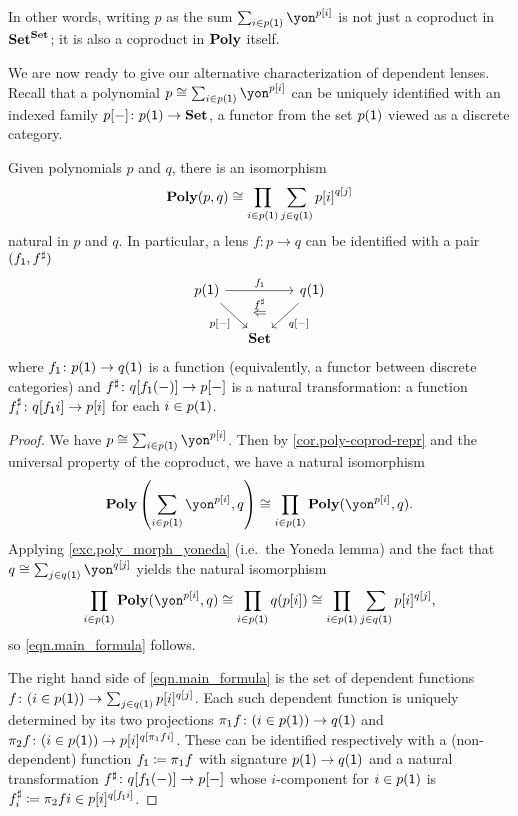 \documentclass[Book-Poly]{subfiles}
\begin{document}
In other words, writing $p$ as the sum $\sum_{i\in p(\1)}\yon^{p[i]}$ is not just a coproduct in $\mathbf{Set}^{\mathbf{Set}}$; it is also a coproduct in $\mathbf{Poly}$ itself.

We are now ready to give our alternative characterization of dependent lenses.
Recall that a polynomial $p\iso\sum_{i\in p(\1)}\yon^{p[i]}$ can be uniquely identified with an indexed family $p[-]\colon p(\textsf{1})\to\mathbf{Set}$, a functor from the set $p(\textsf{1})$ viewed as a discrete category.

\begin{proposition}\label{prop.lens-prod-sum}
Given polynomials $p$ and $q$, there is an isomorphism
\begin{equation}\label{eqn.main_formula}
\mathbf{Poly}(p,q)\cong\prod_{i\in p(\textsf{1})}\sum_{j\in q(\textsf{1})}{p[i]}^{q[j]}
\end{equation}
natural in $p$ and $q$.
In particular, a lens $f\colon p\to q$ can be identified with a pair $(f_{\textsf{1}},f^\sharp)$
\begin{equation}\label{eqn.colax_poly_map}
\begin{tikzcd}[column sep=small]
	p(\1)\ar[dr, "p{[-]}"']\ar[rr, "f_\1"]&~&
	q(\1)\ar[dl, "q{[-]}"]\\&
	\smset\ar[u, phantom, near end, "\overset{f^\sharp}{\Leftarrow}"]
\end{tikzcd}
\end{equation}
where $f_{\textsf{1}}\colon p(\textsf{1})\to q(\textsf{1})$ is a function (equivalently, a functor between discrete categories) and $f^\sharp \colon q[f_{\textsf{1}}(-)] \to p[-]$ is a natural transformation: a function $f^\sharp_i\colon q[f_{\textsf{1}}i]\to p[i]$ for each $i\in p(\textsf{1})$.
\end{proposition}
\begin{proof}
We have $p\iso\sum_{i\in p(\1)}\yon^{p[i]}$.
Then by \cref{cor.poly-coprod-repr} and the universal property of the coproduct, we have a natural isomorphism
\[
    \poly\left(\sum_{i\in p(\1)}\yon^{p[i]}, q\right) \iso \prod_{i\in p(\1)}\poly(\yon^{p[i]},q).
\]
Applying \cref{exc.poly_morph_yoneda} (i.e.\ the Yoneda lemma) and the fact that $q\iso\sum_{j\in q(\1)}\yon^{q[j]}$ yields the natural isomorphism
\[
  \prod_{i\in p(\1)}\poly(\yon^{p[i]},q) \iso \prod_{i\in p(\1)}q(p[i]) \iso \prod_{i\in p(\1)}\sum_{j\in q(\1)}p[i]^{q[j]},
\]
so \eqref{eqn.main_formula} follows.

The right hand side of \eqref{eqn.main_formula} is the set of dependent functions $f\colon(i\in p(\textsf{1}))\to\sum_{j\in q(\textsf{1})}p[i]^{q[j]}$.
Each such dependent function is uniquely determined by its two projections $\pi_1f\colon(i\in p(\textsf{1}))\to q(\textsf{1})$ and $\pi_2f\colon(i\in p(\textsf{1}))\to p[i]^{q[\pi_1fi]}$.
These can be identified respectively with a (non-dependent) function $f_{\textsf{1}}\coloneqq\pi_1f$ with signature $p(\textsf{1})\to q(\textsf{1})$ and a natural transformation $f^\sharp\colon q[f_{\textsf{1}}(-)]\to p[-]$ whose $i$-component for $i\in p(\textsf{1})$ is $f^\sharp_i\coloneqq\pi_2 fi\in p[i]^{q[f_{\textsf{1}}i]}$.
\end{proof}
\end{document}
